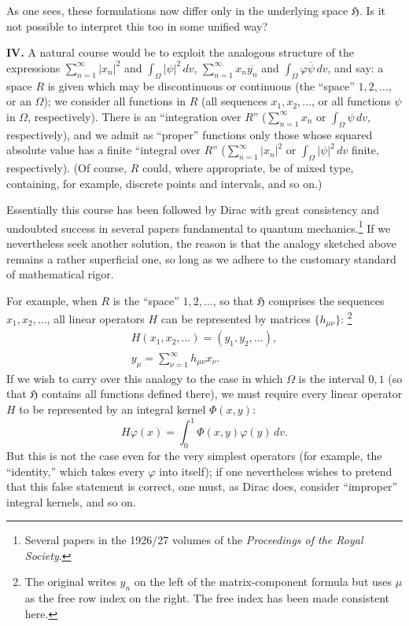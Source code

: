 \documentclass[fontsize=13pt,paper=b5,twoside,bookmarkpackage=false]{scrartcl}
\newcommand{\articleSection}[1]{%
  \par\addvspace{\medskipamount}\phantomsection\label{sec:#1}%
  \pdfbookmark[1]{Section #1}{section-#1}%
  \noindent\textbf{#1.}\enspace\ignorespaces}
\newcounter{translatornote}
\newcommand{\tnote}[1]{%
  \begingroup\stepcounter{translatornote}%
  \renewcommand{\thefootnote}{T\arabic{translatornote}}%
  \footnote[0]{#1}\endgroup}
\begin{document}
As one sees, these formulations now differ only in the underlying space $\mathfrak{H}$. Is it not possible to interpret this too in some unified way?

\articleSection{IV}
A natural course would be to exploit the analogous structure of the expressions $\sum_{n=1}^{\infty}|x_n|^2$ and $\int_\Omega|\psi|^2\,dv$, $\sum_{n=1}^{\infty}x_n\overline{y_n}$ and $\int_\Omega\varphi\overline{\psi}\,dv$, and say: a space $R$ is given which may be discontinuous or continuous (the ``space'' $1,2,\ldots$, or an $\Omega$); we consider all functions in $R$ (all sequences $x_1,x_2,\ldots$, or all functions $\psi$ in $\Omega$, respectively). There is an ``integration over $R$'' ($\sum_{n=1}^{\infty}x_n$ or $\int_\Omega\psi\,dv$, respectively), and we admit as ``proper'' functions only those whose squared absolute value has a finite ``integral over $R$'' ($\sum_{n=1}^{\infty}|x_n|^2$ or $\int_\Omega|\psi|^2\,dv$ finite, respectively). (Of course, $R$ could, where appropriate, be of mixed type, containing, for example, discrete points and intervals, and so on.)

Essentially this course has been followed by Dirac with great consistency and undoubted success in several papers fundamental to quantum mechanics.\footnote[14]{\label{fn:14}Several papers in the 1926/27 volumes of the \emph{Proceedings of the Royal Society}.} If we nevertheless seek another solution, the reason is that the analogy sketched above remains a rather superficial one, so long as we adhere to the customary standard of mathematical rigor.

For example, when $R$ is the ``space'' $1,2,\ldots$, so that $\mathfrak{H}$ comprises the sequences $x_1,x_2,\ldots$, all linear operators $H$ can be represented by matrices $\{h_{\mu\nu}\}$:\tnote{The original writes $y_n$ on the left of the matrix-component formula but uses $\mu$ as the free row index on the right. The free index has been made consistent here.}
\begin{gather*}
H(x_1,x_2,\ldots)=(y_1,y_2,\ldots),\\
y_\mu=\sum_{\nu=1}^{\infty}h_{\mu\nu}x_\nu.
\end{gather*}
If we wish to carry over this analogy to the case in which $\Omega$ is the interval $0,1$ (so that $\mathfrak{H}$ contains all functions defined there), we must require every linear operator $H$ to be represented by an integral kernel $\Phi(x,y)$:
\[
H\varphi(x)=\int_0^1\Phi(x,y)\varphi(y)\,dv.
\]
But this is not the case even for the very simplest operators (for example, the ``identity,'' which takes every $\varphi$ into itself); if one nevertheless wishes to pretend that this false statement is correct, one must, as Dirac does, consider ``improper'' integral kernels, and so on.
\end{document}
